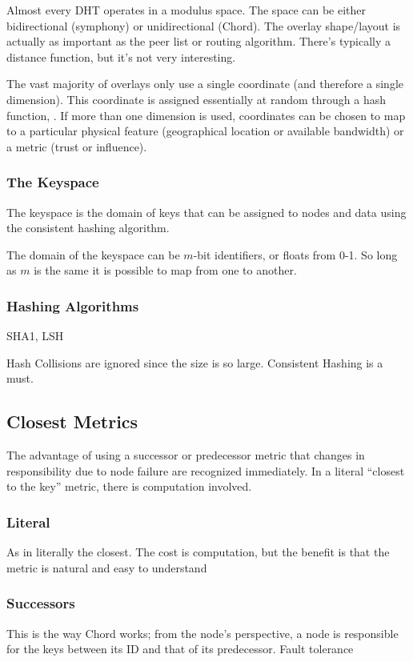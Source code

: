 \documentclass[10pt,letterpaper]{report}
\begin{document}
Almost every DHT operates in a modulus space.  The space can be either bidirectional (symphony) or unidirectional (Chord).
The overlay shape/layout is actually as important as the peer list or routing algorithm.
There's typically a distance function, but it's not very interesting.

The vast majority of overlays only use a single coordinate (and therefore a single dimension).  
This coordinate is assigned essentially at random through a hash function, .  
If more than one dimension is used, coordinates can be chosen to map to a particular physical feature (geographical location  or available bandwidth) or a metric (trust or influence).

\subsubsection{The Keyspace}
The keyspace is the domain of keys that can be assigned to nodes and data using the  consistent hashing algorithm.  

The domain of the keyspace can be $m$-bit identifiers, or floats from 0-1.  So long as $m$ is the same it is possible to map from one to another.

\subsubsection{Hashing Algorithms}
SHA1, LSH

Hash Collisions are ignored since the size is so large.
Consistent Hashing is a must.

\subsection{Closest Metrics}

The advantage of using a successor or predecessor metric that changes in responsibility due to node failure are recognized immediately.  
In a literal ``closest to the key'' metric, there is computation involved.


\subsubsection{Literal}
As in literally the closest.  The cost is computation, but the benefit is that the metric is natural and easy to understand

\subsubsection{Successors}
This is the way Chord works;  from the node's perspective, a node is responsible for the keys between its ID and that of its predecessor.   Fault tolerance
\end{document}
